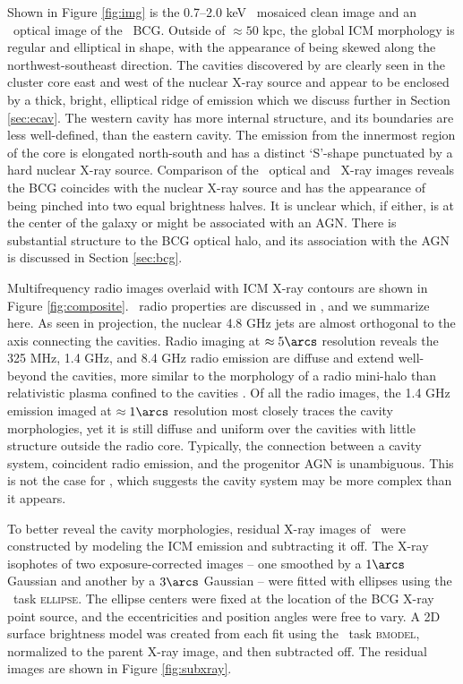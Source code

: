 \documentclass[11pt, preprint]{aastex}
\begin{document}
Shown in Figure \ref{fig:img} is the 0.7--2.0 keV \cxo\ mosaiced clean
image and an \hst\ optical image of the \rbs\ BCG. Outside of $\approx
50$ kpc, the global ICM morphology is regular and elliptical in shape,
with the appearance of being skewed along the northwest-southeast
direction. The cavities discovered by \citet{schindler01} are clearly
seen in the cluster core east and west of the nuclear X-ray source and
appear to be enclosed by a thick, bright, elliptical ridge of emission
which we discuss further in Section \ref{sec:ecav}. The western cavity
has more internal structure, and its boundaries are less well-defined,
than the eastern cavity. The emission from the innermost region of the
core is elongated north-south and has a distinct `S'-shape punctuated
by a hard nuclear X-ray source. Comparison of the \hst\ optical and
\cxo\ X-ray images reveals the BCG coincides with the nuclear X-ray
source and has the appearance of being pinched into two equal
brightness halves. It is unclear which, if either, is at the center of
the galaxy or might be associated with an AGN. There is substantial
structure to the BCG optical halo, and its association with the AGN is
discussed in Section \ref{sec:bcg}.

Multifrequency radio images overlaid with ICM X-ray contours are shown
in Figure \ref{fig:composite}. \rbs\ radio properties are discussed in
\citet{gitti06}, and we summarize here. As seen in projection, the
nuclear 4.8 GHz jets are almost orthogonal to the axis connecting the
cavities. Radio imaging at $\approx 5\arcs$ resolution reveals the 325
MHz, 1.4 GHz, and 8.4 GHz radio emission are diffuse and extend
well-beyond the cavities, more similar to the morphology of a radio
mini-halo than relativistic plasma confined to the cavities
\citep[][Doria et al., in preparation]{2008A&A...486L..31C}. Of all
the radio images, the 1.4 GHz emission imaged at $\approx 1 \arcs$
resolution most closely traces the cavity morphologies, yet it is
still diffuse and uniform over the cavities with little structure
outside the radio core. Typically, the connection between a cavity
system, coincident radio emission, and the progenitor AGN is
unambiguous. This is not the case for \rbs, which suggests the cavity
system may be more complex than it appears.

To better reveal the cavity morphologies, residual X-ray images of
\rbs\ were constructed by modeling the ICM emission and subtracting it
off. The X-ray isophotes of two exposure-corrected images -- one
smoothed by a $1\arcs$ Gaussian and another by a $3\arcs$ Gaussian --
were fitted with ellipses using the \iraf\ task \textsc{ellipse}. The
ellipse centers were fixed at the location of the BCG X-ray point
source, and the eccentricities and position angles were free to
vary. A 2D surface brightness model was created from each fit using
the \iraf\ task \textsc{bmodel}, normalized to the parent X-ray image,
and then subtracted off. The residual images are shown in Figure
\ref{fig:subxray}.
\end{document}
